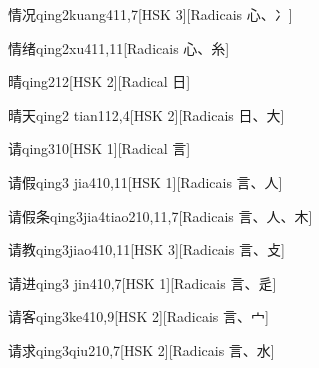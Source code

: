 \begin{entry}{情况}{qing2kuang4}{11,7}[HSK 3][Radicais ⼼、⼎]
\end{entry}

\begin{entry}{情绪}{qing2xu4}{11,11}[Radicais ⼼、⽷]
\end{entry}

\begin{entry}{晴}{qing2}{12}[HSK 2][Radical ⽇]
\end{entry}

\begin{entry}{晴天}{qing2 tian1}{12,4}[HSK 2][Radicais ⽇、⼤]
\end{entry}

\begin{entry}{请}{qing3}{10}[HSK 1][Radical ⾔]
\end{entry}

\begin{entry}{请假}{qing3 jia4}{10,11}[HSK 1][Radicais ⾔、⼈]
\end{entry}

\begin{entry}{请假条}{qing3jia4tiao2}{10,11,7}[Radicais ⾔、⼈、⽊]
\end{entry}

\begin{entry}{请教}{qing3jiao4}{10,11}[HSK 3][Radicais ⾔、⽁]
\end{entry}

\begin{entry}{请进}{qing3 jin4}{10,7}[HSK 1][Radicais ⾔、⾡]
\end{entry}

\begin{entry}{请客}{qing3ke4}{10,9}[HSK 2][Radicais ⾔、⼧]
\end{entry}

\begin{entry}{请求}{qing3qiu2}{10,7}[HSK 2][Radicais ⾔、⽔]
\end{entry}

